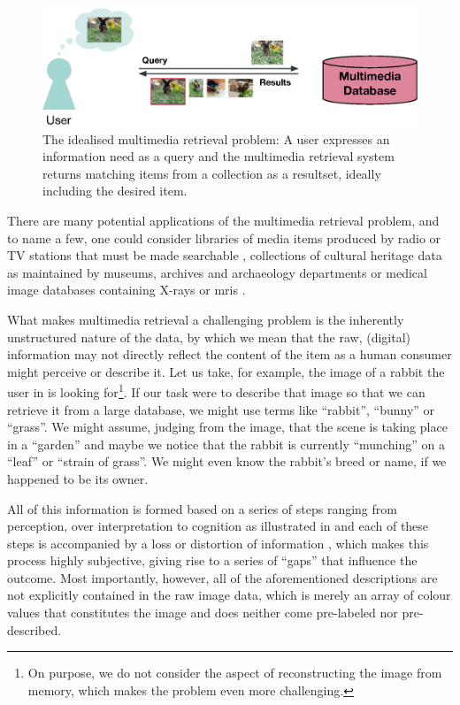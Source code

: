 \begin{figure}[tb]
    \centering
    \includegraphics[width=\textwidth]{figures/mr-ideal.eps}
    \caption{The idealised multimedia retrieval problem: A user expresses an information need as a query and the multimedia retrieval system returns matching items from a collection as a resultset, ideally including the desired item.}
    \label{figure:mr-ideal}
\end{figure}

There are many potential applications of the multimedia retrieval problem, and to name a few, one could consider libraries of media items produced by radio or TV stations that must be made searchable \cite{Watanabe:1998Multimedia}, collections of cultural heritage data as maintained by museums, archives and archaeology departments \cite{Tsai:2007Review} or medical image databases containing X-rays or \acrshort{mri}s \cite{Mueller:2004Review}.

What makes multimedia retrieval a challenging problem is the inherently unstructured nature of the data, by which we mean that the raw, (digital) information may not directly reflect the content of the item as a human consumer might perceive or describe it. Let us take, for example, the image of a rabbit the user in  is looking for\footnote{On purpose, we do not consider the aspect of reconstructing the image from memory, which makes the problem even more challenging.}. If our task were to describe that image so that we can retrieve it from a large database, we might use terms like ``rabbit'', ``bunny'' or ``grass''. We might assume, judging from the image, that the scene is taking place in a ``garden'' and maybe we notice that the rabbit is currently ``munching'' on a ``leaf'' or ``strain of grass''. We might even know the rabbit's breed or name, if we happened to be its owner.

All of this information is formed based on a series of steps ranging from perception, over interpretation to cognition as illustrated in  and each of these steps is accompanied by a loss or distortion of information \cite{Javanmardi:2021Exploring,Rossetto:2018thesis}, which makes this process highly subjective, giving rise to a series of ``gaps'' that influence the outcome. Most importantly, however, all of the aforementioned descriptions are not explicitly contained in the raw image data, which is merely an array of colour values that constitutes the image and does neither come pre-labeled nor pre-described.

